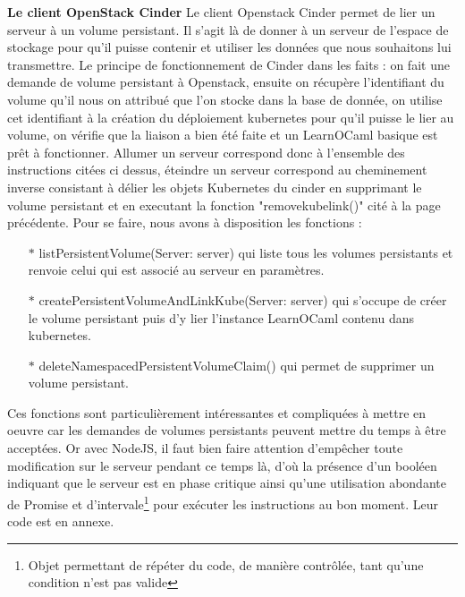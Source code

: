 \documentclass{article}
\begin{document}
\textbf{Le client OpenStack Cinder}
\newline
\newline
Le client Openstack Cinder permet de lier un serveur à un volume persistant. Il s'agit là de donner à un serveur de l'espace de stockage pour qu'il puisse contenir et utiliser les données que nous souhaitons lui transmettre.
\newline
Le principe de fonctionnement de Cinder dans les faits : on fait une demande de volume persistant à Openstack, ensuite on récupère l'identifiant du volume qu'il nous on attribué que l'on stocke dans la base de donnée, on utilise cet identifiant à la création du déploiement kubernetes pour qu'il puisse le lier au volume, on vérifie que la liaison a bien été faite et un LearnOCaml basique est prêt à fonctionner.
\newline
Allumer un serveur correspond donc à l'ensemble des instructions citées ci dessus, éteindre un serveur correspond au cheminement inverse consistant à délier les objets Kubernetes du cinder en supprimant le volume persistant et en executant la fonction "removekubelink()" cité à la page précédente.
\newline
Pour se faire, nous avons à disposition les fonctions :
\begin{itemize}
	\item[$\ast$]listPersistentVolume(Server: server) qui liste tous les volumes persistants et renvoie celui qui est associé au serveur en paramètres.
	\item[$\ast$]createPersistentVolumeAndLinkKube(Server: server) qui s'occupe de créer le volume persistant puis d'y lier l'instance LearnOCaml contenu dans kubernetes.
	\item[$\ast$]deleteNamespacedPersistentVolumeClaim() qui permet de supprimer un volume persistant.
\end{itemize}
Ces fonctions sont particulièrement intéressantes et compliquées à mettre en oeuvre car les demandes de volumes persistants peuvent mettre du temps à être acceptées. Or avec NodeJS, il faut bien faire attention d'empêcher toute modification sur le serveur pendant ce temps là, d'où la présence d'un booléen indiquant que le serveur est en phase critique ainsi qu'une utilisation abondante de Promise et d'intervale\footnote{Objet permettant de répéter du code, de manière contrôlée, tant qu'une condition n'est pas valide} pour exécuter les instructions au bon moment.
Leur code est en annexe.
\newpage
\end{document}
